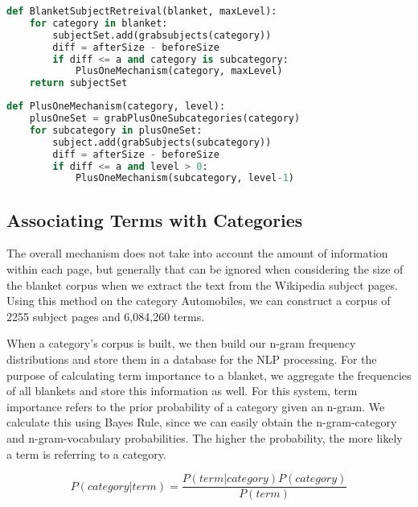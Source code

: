 \begin{lstlisting}[language=Python, frame=none, tabsize=2, caption=BlanketSubjectRetreival, label=BlanketSubjectRetreival, basicstyle=\small]
def BlanketSubjectRetreival(blanket, maxLevel):
	for category in blanket:
		subjectSet.add(grabsubjects(category))
		diff = afterSize - beforeSize
		if diff <= a and category is subcategory:
			PlusOneMechanism(category, maxLevel)
	return subjectSet
\end{lstlisting}

\begin{lstlisting}[language=Python, frame=none, tabsize=2, caption=PlusOneMechanism, label=PlusOneMechanism, basicstyle=\small]
def PlusOneMechanism(category, level):
	plusOneSet = grabPlusOneSubcategories(category)
	for subcategory in plusOneSet:
		subject.add(grabSubjects(subcategory))
		diff = afterSize - beforeSize
		if diff <= a and level > 0:
			PlusOneMechanism(subcategory, level-1)


\end{lstlisting}


\subsection{Associating Terms with Categories}
\label{sec:terms}

The overall mechanism does not take into account the amount of
information within each page, but generally that can be ignored when
considering the size of the blanket corpus when we extract the text
from the Wikipedia subject pages. Using this method on the category
Automobiles, we can construct a corpus of 2255 subject pages and
6,084,260 terms.

When a category's corpus is built, we then build our n-gram frequency
distributions and store them in a database for the NLP processing. For
the purpose of calculating term importance to a blanket, we aggregate
the frequencies of all blankets and store this information as
well. For this system, term importance refers to the prior probability
of a category given an n-gram. We calculate this using Bayes Rule,
since we can easily obtain the n-gram-category and n-gram-vocabulary
probabilities. The higher the probability, the more likely a term is
referring to a category.

\begin{equation}
P (category | term) = \frac{P(term | category) P(category)}{P(term)}
\end{equation}
